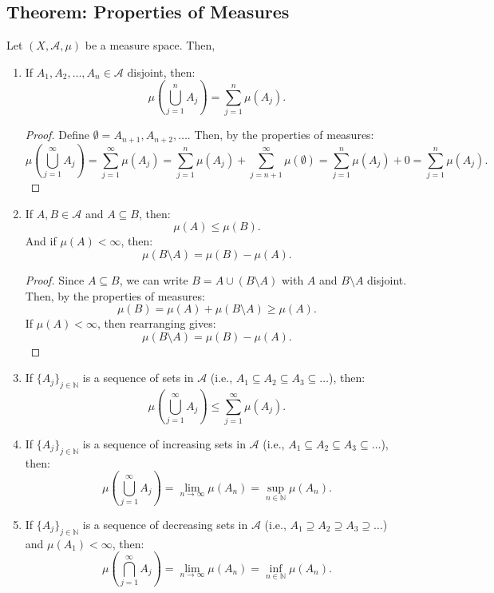 \documentclass[11pt]{article}
\begin{document}
\subsection{Theorem: Properties of Measures}
Let \((X, \mathcal{A}, \mu)\) be a measure space. Then, 
\begin{enumerate}
    \item If \(A_1, A_2, \ldots, A_n \in \mathcal{A}\) disjoint, then:
    \[\mu\left(\bigcup_{j=1}^{n} A_j\right) = \sum_{j=1}^{n} \mu(A_j).\]
    \begin{proof}
        Define \(\emptyset = A_{n+1}, A_{n+2}, \ldots\). Then, by the properties of measures:
        \[\mu\left(\bigcup_{j=1}^{\infty} A_j\right) = \sum_{j=1}^{\infty} \mu(A_j) = \sum_{j=1}^{n} \mu(A_j) + \sum_{j=n+1}^{\infty} \mu(\emptyset) = \sum_{j=1}^{n} \mu(A_j) + 0 = \sum_{j=1}^{n} \mu(A_j).\]
    \end{proof}
    \item If \(A, B \in \mathcal{A}\) and \(A \subseteq B\), then:
    \[\mu(A) \leq \mu(B).\]
    And if \(\mu(A) < \infty\), then:
    \[\mu(B \setminus A) = \mu(B) - \mu(A).\]
    \begin{proof}
        Since \(A \subseteq B\), we can write \(B = A \cup (B \setminus A)\) with \(A\) and \(B \setminus A\) disjoint. Then, by the properties of measures:
        \[\mu(B) = \mu(A) + \mu(B \setminus A) \geq \mu(A).\]
        If \(\mu(A) < \infty\), then rearranging gives:
        \[\mu(B \setminus A) = \mu(B) - \mu(A).\]
    \end{proof}
    \item If \(\{A_j\}_{j \in \mathbb{N}}\) is a sequence of sets in \(\mathcal{A}\) (i.e., \(A_1 \subseteq A_2 \subseteq A_3 \subseteq \ldots\)), then:
    \[\mu\left(\bigcup_{j=1}^{\infty} A_j\right) \leq \sum_{j=1}^{\infty} \mu(A_j).\]
    \item If \(\{A_j\}_{j \in \mathbb{N}}\) is a sequence of increasing sets in \(\mathcal{A}\) (i.e., \(A_1 \subseteq A_2 \subseteq A_3 \subseteq \ldots\)), then:
    \[\mu\left(\bigcup_{j=1}^{\infty} A_j\right) = \lim_{n \to \infty} \mu(A_n) = \sup_{n \in \mathbb{N}} \mu(A_n).\]
    \item If \(\{A_j\}_{j \in \mathbb{N}}\) is a sequence of decreasing sets in \(\mathcal{A}\) (i.e., \(A_1 \supseteq A_2 \supseteq A_3 \supseteq \ldots\)) and \(\mu(A_1) < \infty\), then:
    \[\mu\left(\bigcap_{j=1}^{\infty} A_j\right) = \lim_{n \to \infty} \mu(A_n) = \inf_{n \in \mathbb{N}} \mu(A_n).\]
    
\end{enumerate}
\end{document}
